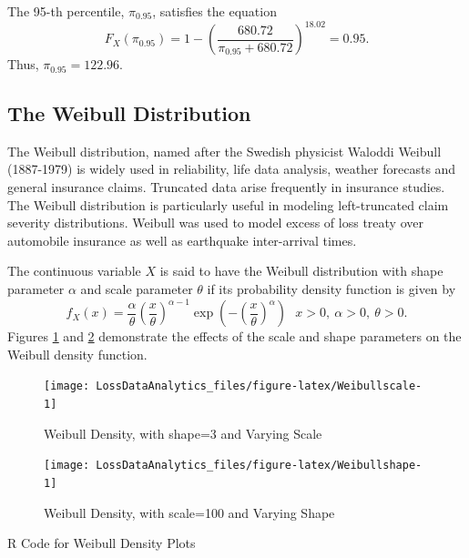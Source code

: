 \documentclass[]{book}
\theoremstyle{definition}
\theoremstyle{definition}
\theoremstyle{definition}
\theoremstyle{remark}
\begin{document}
The 95-th percentile, \(\pi_{0.95}\), satisfies the equation
\[F_{X}\left( \pi_{0.95} \right) = 1 - \left( \frac{680.72}{\pi_{0.95} + 680.72} \right)^{18.02} = 0.95.\]
Thus, \(\pi_{0.95} = 122.96\).

\subsection{The Weibull Distribution}\label{the-weibull-distribution}

The Weibull distribution, named after the Swedish physicist Waloddi
Weibull (1887-1979) is widely used in reliability, life data analysis,
weather forecasts and general insurance claims. Truncated data arise
frequently in insurance studies. The Weibull distribution is
particularly useful in modeling left-truncated claim severity
distributions. Weibull was used to model excess of loss treaty over
automobile insurance as well as earthquake inter-arrival times.

The continuous variable \(X\) is said to have the Weibull distribution
with shape parameter \(\alpha\) and scale parameter \(\theta\) if its
probability density function is given by
\[f_{X}\left( x \right) = \frac{\alpha}{\theta}\left( \frac{x}{\theta} \right)^{\alpha - 1} \exp \left(- \left( \frac{x}{\theta} \right)^{\alpha}\right) \ \ \ x > 0,\ \alpha > 0,\ \theta > 0.\]
Figures \ref{fig:Weibullscale} and \ref{fig:Weibullshape} demonstrate
the effects of the scale and shape parameters on the Weibull density
function.

\begin{figure}

{\centering \texttt{[image: LossDataAnalytics\_files/figure-latex/Weibullscale-1]} 

}

\caption{Weibull Density, with shape=3 and Varying Scale}\label{fig:Weibullscale}
\end{figure}

\begin{figure}

{\centering \texttt{[image: LossDataAnalytics\_files/figure-latex/Weibullshape-1]} 

}

\caption{Weibull Density, with scale=100 and Varying Shape}\label{fig:Weibullshape}
\end{figure}

R Code for Weibull Density Plots
\end{document}
